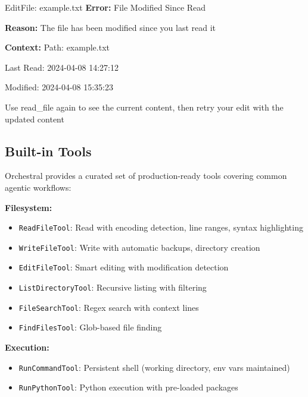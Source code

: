 \documentclass{article}
\begin{document}

\begin{orchestraltoolerrormessage}{EditFile: example.txt}
\textbf{Error:} File Modified Since Read

\textbf{Reason:} The file has been modified since you last read it

\textbf{Context:} Path: example.txt

Last Read: 2024-04-08 14:27:12

Modified: 2024-04-08 15:35:23

Use read\_file again to see the current content, then retry your edit with the updated content
\end{orchestraltoolerrormessage}



\subsection{Built-in Tools}

Orchestral provides a curated set of production-ready tools covering common agentic workflows:

\textbf{Filesystem:}
\begin{itemize}
    \item \texttt{ReadFileTool}: Read with encoding detection, line ranges, syntax highlighting
    \item \texttt{WriteFileTool}: Write with automatic backups, directory creation
    \item \texttt{EditFileTool}: Smart editing with modification detection
    \item \texttt{ListDirectoryTool}: Recursive listing with filtering
    \item \texttt{FileSearchTool}: Regex search with context lines
    \item \texttt{FindFilesTool}: Glob-based file finding
\end{itemize}

\textbf{Execution:}
\begin{itemize}
    \item \texttt{RunCommandTool}: Persistent shell (working directory, env vars maintained)
    \item \texttt{RunPythonTool}: Python execution with pre-loaded packages
\end{itemize}
\end{document}
